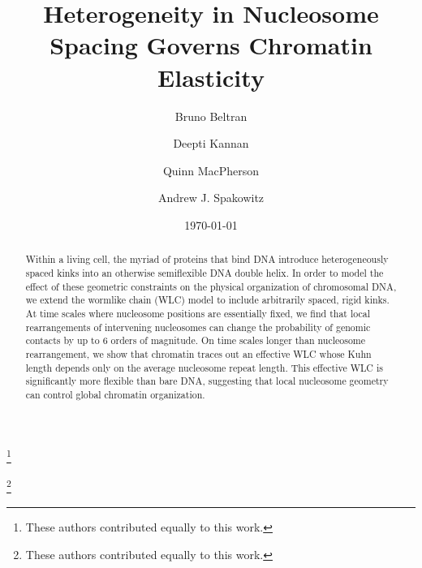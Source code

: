 \documentclass[%
 reprint,
superscriptaddress,
showpacs,preprintnumbers,
 amsmath,amssymb,
 aps,
 prl,
]{revtex4-1}
\begin{document}
\title{Heterogeneity in Nucleosome Spacing Governs Chromatin Elasticity}%

\author{Bruno Beltran}
\thanks{These authors contributed equally to this work.}%
%
\author{Deepti Kannan}%
\thanks{These authors contributed equally to this work.}%
\author{Quinn MacPherson}%
%
\author{Andrew J. Spakowitz}%
%
%
%
%
\date{\today}%

\begin{abstract}
Within a living cell, the myriad of proteins that bind DNA introduce heterogeneously spaced
    kinks into an otherwise semiflexible DNA double helix.
In order to model the effect of these geometric constraints on the physical organization of
    chromosomal DNA, we extend the wormlike chain (WLC) model to include arbitrarily spaced,
    rigid kinks.
At time scales where nucleosome positions are essentially fixed, we find that local
    rearrangements of intervening nucleosomes can change the probability of genomic contacts by up to 6 orders of magnitude.
On time scales longer than nucleosome rearrangement, we show that chromatin traces out an
    effective WLC whose Kuhn length depends only on the average nucleosome repeat length.
This effective WLC is significantly more flexible than bare DNA, suggesting that local
    nucleosome geometry can control global chromatin organization.
\end{abstract}

\maketitle
\end{document}

